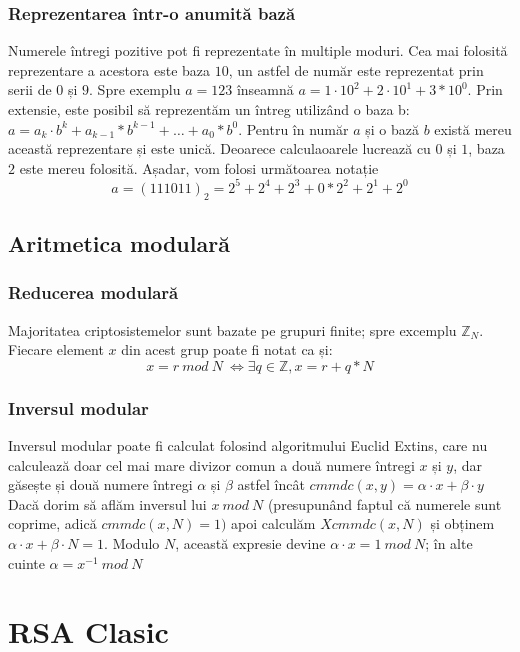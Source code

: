 \documentclass[12]{report}
\begin{document}
      \subsubsection{Reprezentarea într-o anumită bază}
      Numerele întregi pozitive pot fi reprezentate în multiple moduri. Cea mai folosită reprezentare a acestora este baza $10$, un astfel de număr este reprezentat prin serii de $0$ și $9$. Spre exemplu $ a = 123 $ înseamnă $ a = 1 \cdot   10^2 + 2 \cdot 10^1 + 3*10^0$. Prin extensie, este posibil să reprezentăm un întreg utilizând o baza b: $ a = a_k \cdot   b^k + a_{k-1}*b^{k-1} +  \dots  + a_0*b^0 $. Pentru în număr $a$ și o bază $b$ există mereu această reprezentare și este unică. Deoarece calculaoarele lucrează cu $0$ și $1$, baza $2$ este mereu folosită. Așadar, vom folosi următoarea notație \\
      $$ a=(111011)_2 = 2^5 + 2^4 + 2^3 + 0*2^2 + 2^1 + 2^0 $$
      \subsection{Aritmetica modulară}
       \subsubsection{Reducerea modulară}
        Majoritatea criptosistemelor sunt bazate pe grupuri finite; spre excemplu $ \mathbb{Z}_N $. Fiecare element $x$ din acest grup poate fi notat ca și: \\
        $$ x = r  \ mod \ N \ \Leftrightarrow \exists q \in \mathbb{Z} , x = r+q*N$$
       \subsubsection{Inversul modular}
         Inversul modular poate fi calculat folosind algoritmului Euclid Extins, care nu calculează doar cel mai mare divizor comun a două numere întregi $x$ și $y$, dar găsește și două numere întregi $ \alpha $ și $  \beta $ astfel încât $ cmmdc(x,y) = \alpha \cdot   x + \beta \cdot   y$ \\
        Dacă dorim să aflăm inversul lui  $x \ mod \ N$ (presupunând faptul că numerele sunt coprime, adică $cmmdc(x,N)=1)$ apoi calculăm $Xcmmdc(x,N)$ și obținem $ \alpha \cdot   x + \beta \cdot   N = 1$. Modulo $N$, această expresie devine $\alpha \cdot   x  = 1 \ mod \ N$; în alte cuinte $\alpha= x^{-1} \ mod \ N$
        
       
    \section{RSA Clasic}
\end{document}
